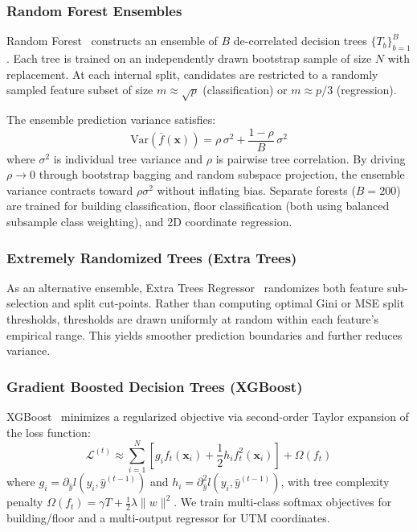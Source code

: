 \subsubsection{Random Forest Ensembles}
Random Forest~\cite{breiman2001random} constructs an ensemble of $B$ de-correlated decision trees $\{T_b\}_{b=1}^B$. Each tree is trained on an independently drawn bootstrap sample of size $N$ with replacement. At each internal split, candidates are restricted to a randomly sampled feature subset of size $m \approx \sqrt{p}$ (classification) or $m \approx p/3$ (regression). 

The ensemble prediction variance satisfies:
\begin{equation}
\label{eq:rf-variance}
\text{Var}(\bar{f}(\mathbf{x})) = \rho \, \sigma^2 + \frac{1 - \rho}{B} \, \sigma^2
\end{equation}
where $\sigma^2$ is individual tree variance and $\rho$ is pairwise tree correlation. By driving $\rho \to 0$ through bootstrap bagging and random subspace projection, the ensemble variance contracts toward $\rho \sigma^2$ without inflating bias. Separate forests ($B=200$) are trained for building classification, floor classification (both using balanced subsample class weighting), and 2D coordinate regression.

\subsubsection{Extremely Randomized Trees (Extra Trees)}
As an alternative ensemble, Extra Trees Regressor~\cite{geurts2006extremely} randomizes both feature sub-selection and split cut-points. Rather than computing optimal Gini or MSE split thresholds, thresholds are drawn uniformly at random within each feature's empirical range. This yields smoother prediction boundaries and further reduces variance.

\subsubsection{Gradient Boosted Decision Trees (XGBoost)}
XGBoost~\cite{chen2016xgboost} minimizes a regularized objective via second-order Taylor expansion of the loss function:
\begin{equation}
\mathcal{L}^{(t)} \approx \sum_{i=1}^N \left[ g_i f_t(\mathbf{x}_i) + \frac{1}{2} h_i f_t^2(\mathbf{x}_i) \right] + \Omega(f_t)
\end{equation}
where $g_i = \partial_{\hat{y}} l(y_i, \hat{y}^{(t-1)})$ and $h_i = \partial^2_{\hat{y}} l(y_i, \hat{y}^{(t-1)})$, with tree complexity penalty $\Omega(f_t) = \gamma T + \frac{1}{2} \lambda \|w\|^2$. We train multi-class softmax objectives for building/floor and a multi-output regressor for UTM coordinates.

